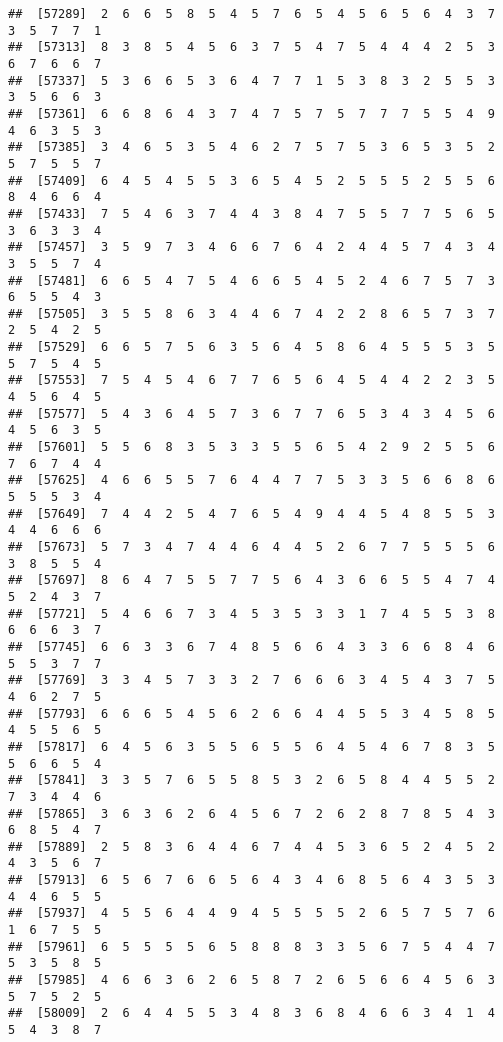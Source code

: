 \documentclass[
]{book}
\begin{document}
\begin{verbatim}
##  [57289]  2  6  6  5  8  5  4  5  7  6  5  4  5  6  5  6  4  3  7  3  5  7  7  1
##  [57313]  8  3  8  5  4  5  6  3  7  5  4  7  5  4  4  4  2  5  3  6  7  6  6  7
##  [57337]  5  3  6  6  5  3  6  4  7  7  1  5  3  8  3  2  5  5  3  3  5  6  6  3
##  [57361]  6  6  8  6  4  3  7  4  7  5  7  5  7  7  7  5  5  4  9  4  6  3  5  3
##  [57385]  3  4  6  5  3  5  4  6  2  7  5  7  5  3  6  5  3  5  2  5  7  5  5  7
##  [57409]  6  4  5  4  5  5  3  6  5  4  5  2  5  5  5  2  5  5  6  8  4  6  6  4
##  [57433]  7  5  4  6  3  7  4  4  3  8  4  7  5  5  7  7  5  6  5  3  6  3  3  4
##  [57457]  3  5  9  7  3  4  6  6  7  6  4  2  4  4  5  7  4  3  4  3  5  5  7  4
##  [57481]  6  6  5  4  7  5  4  6  6  5  4  5  2  4  6  7  5  7  3  6  5  5  4  3
##  [57505]  3  5  5  8  6  3  4  4  6  7  4  2  2  8  6  5  7  3  7  2  5  4  2  5
##  [57529]  6  6  5  7  5  6  3  5  6  4  5  8  6  4  5  5  5  3  5  5  7  5  4  5
##  [57553]  7  5  4  5  4  6  7  7  6  5  6  4  5  4  4  2  2  3  5  4  5  6  4  5
##  [57577]  5  4  3  6  4  5  7  3  6  7  7  6  5  3  4  3  4  5  6  4  5  6  3  5
##  [57601]  5  5  6  8  3  5  3  3  5  5  6  5  4  2  9  2  5  5  6  7  6  7  4  4
##  [57625]  4  6  6  5  5  7  6  4  4  7  7  5  3  3  5  6  6  8  6  5  5  5  3  4
##  [57649]  7  4  4  2  5  4  7  6  5  4  9  4  4  5  4  8  5  5  3  4  4  6  6  6
##  [57673]  5  7  3  4  7  4  4  6  4  4  5  2  6  7  7  5  5  5  6  3  8  5  5  4
##  [57697]  8  6  4  7  5  5  7  7  5  6  4  3  6  6  5  5  4  7  4  5  2  4  3  7
##  [57721]  5  4  6  6  7  3  4  5  3  5  3  3  1  7  4  5  5  3  8  6  6  6  3  7
##  [57745]  6  6  3  3  6  7  4  8  5  6  6  4  3  3  6  6  8  4  6  5  5  3  7  7
##  [57769]  3  3  4  5  7  3  3  2  7  6  6  6  3  4  5  4  3  7  5  4  6  2  7  5
##  [57793]  6  6  6  5  4  5  6  2  6  6  4  4  5  5  3  4  5  8  5  4  5  5  6  5
##  [57817]  6  4  5  6  3  5  5  6  5  5  6  4  5  4  6  7  8  3  5  5  6  6  5  4
##  [57841]  3  3  5  7  6  5  5  8  5  3  2  6  5  8  4  4  5  5  2  7  3  4  4  6
##  [57865]  3  6  3  6  2  6  4  5  6  7  2  6  2  8  7  8  5  4  3  6  8  5  4  7
##  [57889]  2  5  8  3  6  4  4  6  7  4  4  5  3  6  5  2  4  5  2  4  3  5  6  7
##  [57913]  6  5  6  7  6  6  5  6  4  3  4  6  8  5  6  4  3  5  3  4  4  6  5  5
##  [57937]  4  5  5  6  4  4  9  4  5  5  5  5  2  6  5  7  5  7  6  1  6  7  5  5
##  [57961]  6  5  5  5  5  6  5  8  8  8  3  3  5  6  7  5  4  4  7  5  3  5  8  5
##  [57985]  4  6  6  3  6  2  6  5  8  7  2  6  5  6  6  4  5  6  3  5  7  5  2  5
##  [58009]  2  6  4  4  5  5  3  4  8  3  6  8  4  6  6  3  4  1  4  5  4  3  8  7

\end{verbatim}
\end{document}
